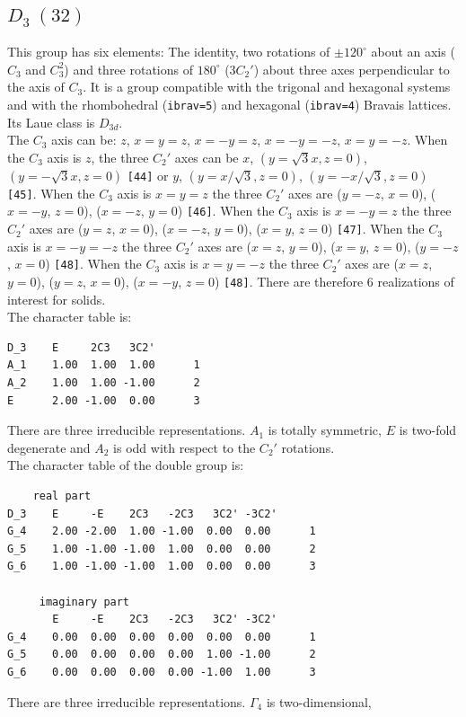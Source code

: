 \documentclass[12pt,a4paper]{article}
\begin{document}
\subsection{\color{web-blue}$D_3\ (32)$}
This group has six elements: The identity, two rotations of $\pm120^\circ$ about
an axis ($C_3$ and $C_3^2$) and three rotations of $180^\circ$ 
($3C_2'$) about three axes perpendicular to the axis of $C_3$.
It is a group compatible with the trigonal and hexagonal systems and with the
rhombohedral (\texttt{ibrav=5}) and hexagonal (\texttt{ibrav=4})
Bravais lattices. \\ 
Its Laue class is $D_{3d}$. \\
The $C_3$ axis can be: $z$, $x=y=z$, $x=-y=z$, $x=-y=-z$, $x=y=-z$.
When the $C_3$ axis is $z$, the three $C_2'$ axes can be
$x$, $(y=\sqrt{3}x, z=0)$, $(y=-\sqrt{3}x, z=0)$ \texttt{[44]} or 
$y$, $(y=x/\sqrt{3}, z=0)$, $(y=-x/\sqrt{3}, z=0)$ \texttt{[45]}. 
When the $C_3$ axis is $x=y=z$ the three $C_2'$ axes are
($y=-z$, $x=0$), ($x=-y$, $z=0$), ($x=-z$, $y=0$) \texttt{[46]}.
When the $C_3$ axis is $x=-y=z$ the three $C_2'$ axes are
($y=z$, $x=0$), ($x=-z$, $y=0$), ($x=y$, $z=0$) \texttt{[47]}.
When the $C_3$ axis is $x=-y=-z$ the three $C_2'$ axes are
($x=z$, $y=0$), ($x=y$, $z=0$), ($y=-z$, $x=0$) \texttt{[48]}.
When the $C_3$ axis is $x=y=-z$ the three $C_2'$ axes are
($x=z$, $y=0$), ($y=z$, $x=0$), ($x=-y$, $z=0$) \texttt{[48]}. 
There are therefore $6$ realizations of interest for solids. \\
The character table is:
\begin{verbatim}
D_3    E     2C3   3C2'
A_1    1.00  1.00  1.00      1
A_2    1.00  1.00 -1.00      2
E      2.00 -1.00  0.00      3
\end{verbatim}
There are three irreducible representations. $A_1$ is totally symmetric,
$E$ is two-fold degenerate and $A_2$ is odd with respect to the
$C_2'$ rotations.\\
The character table of the double group is:
\begin{verbatim}
    real part
D_3    E     -E    2C3   -2C3   3C2' -3C2'
G_4    2.00 -2.00  1.00 -1.00  0.00  0.00      1
G_5    1.00 -1.00 -1.00  1.00  0.00  0.00      2
G_6    1.00 -1.00 -1.00  1.00  0.00  0.00      3

     imaginary part
       E     -E    2C3   -2C3   3C2' -3C2'
G_4    0.00  0.00  0.00  0.00  0.00  0.00      1
G_5    0.00  0.00  0.00  0.00  1.00 -1.00      2
G_6    0.00  0.00  0.00  0.00 -1.00  1.00      3
\end{verbatim}
There are three irreducible representations. $\Gamma_4$ is two-dimensional,
\end{document}

